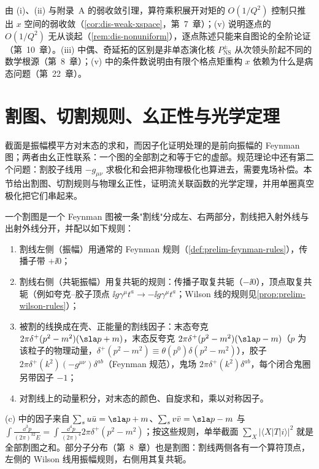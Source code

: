 由 (i)、(ii) 与附录~A 的弱收敛引理，算符乘积展开对矩的 $O(1/Q^2)$ 控制只推出 $x$ 空间的弱收敛（\cref{cor:dis-weak-xspace}，第~7~章）；(v) 说明逐点的 $O(1/Q^2)$ 无从谈起（\cref{rem:dis-nonuniform}），逐点陈述只能来自图论的全阶论证（第~10~章）。(iii) 中偶、奇延拓的区别是非单态演化核 $P^\pm_{\mathrm{NS}}$ 从次领头阶起不同的数学根源（第~8~章）；(v) 中的条件数说明由有限个格点矩重构 $x$ 依赖为什么是病态问题（第~22~章）。
\section{割图、切割规则、幺正性与光学定理}\label{sec:prelim-cuts}

截面是振幅模平方对末态的求和，而因子化证明处理的是前向振幅的 Feynman 图；两者由幺正性联系：一个图的全部割之和等于它的虚部。规范理论中还有第二个问题：割胶子线用 $-g_{\mu\nu}$ 求极化和会把非物理极化也算进去，需要鬼场补偿。本节给出割图、切割规则与物理幺正性，证明流关联函数的光学定理，并用单圈真空极化把它们串起来。

\begin{definition}[割图]\label{def:prelim-cut}
一个割图是一个 Feynman 图被一条"割线"分成左、右两部分，割线把入射外线与出射外线分开，并配以如下规则：
\begin{enumerate}[label=(\alph*),leftmargin=2.2em,itemsep=0pt,topsep=2pt]
\item 割线左侧（振幅）用通常的 Feynman 规则（\cref{def:prelim-feynman-rules}），传播子带 $+\ii0$；
\item 割线右侧（共轭振幅）用复共轭的规则：传播子取复共轭（$-\ii0$），顶点取复共轭（例如夸克--胶子顶点 $\ii g\gamma^\mu t^a\to-\ii g\gamma^\mu t^a$；Wilson 线的规则见\cref{prop:prelim-wilson-rules}）；
\item 被割的线换成在壳、正能量的割线因子：末态夸克 $2\pi\delta^+(p^2-m^2)(\sla p+m)$，末态反夸克 $2\pi\delta^+(p^2-m^2)(\sla p-m)$（$p$ 为该粒子的物理动量，$\delta^+(p^2-m^2)\equiv\theta(p^0)\delta(p^2-m^2)$），胶子 $2\pi\delta^+(k^2)(-g^{\mu\nu})\delta^{ab}$（Feynman 规范），鬼场 $2\pi\delta^+(k^2)\delta^{ab}$，每个闭合鬼圈另带因子 $-1$；
\item 对割线上的动量积分，对末态的颜色、自旋求和，乘以对称因子。
\end{enumerate}
\end{definition}

(c) 中的因子来自 $\sum_su\bar u=\sla p+m$、$\sum_sv\bar v=\sla p-m$ 与 $\int\frac{\dd^3p}{(2\pi)^32E}=\int\frac{\dd^4p}{(2\pi)^4}2\pi\delta^+(p^2-m^2)$；按这些规则，单举截面 $\sum_X|\langle X|T|i\rangle|^2$ 就是全部割图之和。部分子分布（第~8~章）也是割图：割线两侧各有一个算符顶点，左侧的 Wilson 线用振幅规则，右侧用其复共轭。

